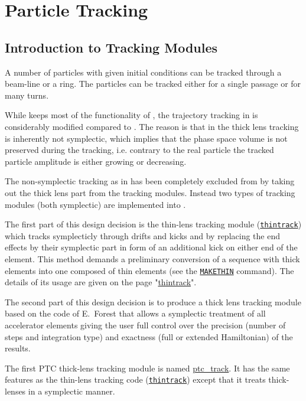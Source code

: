 \chapter{Particle Tracking}
\label{chap:tracking}\label{chap:thintrack}


\section{Introduction to \madx Tracking Modules}
\label{sec:trackintro}

A number of particles with given initial conditions can be tracked
through a beam-line or a ring. The particles can be tracked either for a
single passage or for many turns.  


While \madx keeps most of the functionality of \madeight, the
trajectory tracking in \madx is considerably modified compared to
\madeight. 
The reason is that in \madeight the thick lens tracking is inherently not
symplectic, which implies that the phase space volume is not preserved
during the tracking, i.e. contrary to the real particle the tracked
particle amplitude is either growing or decreasing. 


The non-symplectic tracking as in \madeight has been completely excluded
from \madx by taking out the thick lens part from the tracking
modules. Instead two types of tracking modules (both symplectic) are
implemented into \madx. 


The first part of this design decision is the thin-lens tracking module
(\href{../thintrack/thintrack.html}{\tt thintrack})  which tracks
symplecticly through drifts and kicks and by replacing the end effects
by their symplectic part in form of an additional kick on either  end of
the element. This method demands a preliminary conversion of a sequence
with thick elements into one composed of thin elements (see the
\hyperref[chap:makethin]{\tt MAKETHIN} command). The
details of its usage are given on the page
"\href{../thintrack/thintrack.html}{thintrack}". 


The second part of this design decision is to produce a thick lens
tracking module based on the \ptc code of E.~Forest that
allows a symplectic treatment of all accelerator elements giving the
user full control over the precision (number of steps and integration
type) and exactness (full or extended Hamiltonian) of the results. 


The first PTC thick-lens tracking module is named
\href{../ptc_track/ptc_track.html}{ptc\_track}. 
It has the same features as the thin-lens tracking code
(\texttt{\href{../thintrack/thintrack.html}{thintrack}}) except that it
treats thick-lenses in a symplectic manner. 


